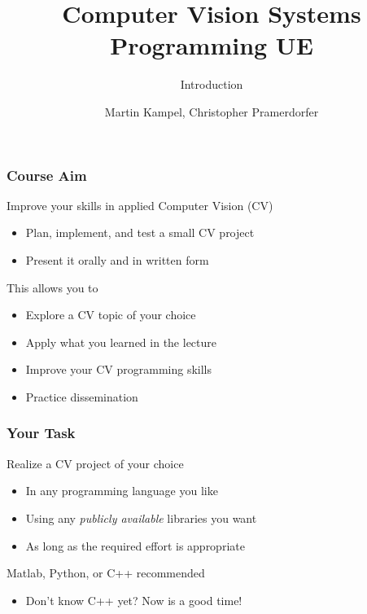 \documentclass[xetex,professionalfont]{beamer}
\title{Computer Vision Systems Programming UE}
\subtitle{Introduction}
\author{Martin Kampel, Christopher Pramerdorfer}
\institute{Computer Vision Lab, Vienna University of Technology}
\begin{document}

\begin{frame}
\maketitle
\end{frame}


\begin{frame}
\frametitle{Course Aim}

Improve your skills in applied Computer Vision (CV)
\begin{itemize}
	\item Plan, implement, and test a small CV project
	\item Present it orally and in written form
\end{itemize}

\bigskip
This allows you to
\begin{itemize}
	\item Explore a CV topic of your choice
	\item Apply what you learned in the lecture
	\item Improve your CV programming skills
	\item Practice dissemination
\end{itemize}

\end{frame}


\begin{frame}
\frametitle{Your Task}

Realize a CV project of your choice
\begin{itemize}
	\item In any programming language you like
	\item Using any \emph{publicly available} libraries you want
	\item As long as the required effort is appropriate
\end{itemize}

\bigskip
Matlab, Python, or C++ recommended
\begin{itemize}
	\item Don't know C++ yet? Now is a good time!
\end{itemize}

\end{frame}
\end{document}
